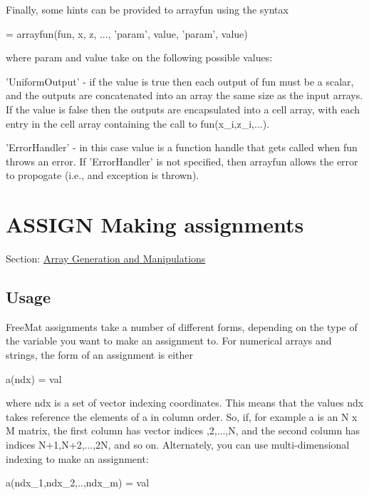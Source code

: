 Finally, some hints can be provided to {\ttfamily arrayfun} using the syntax \begin{DoxyVerb}   [y1,y2,...] = arrayfun(fun, x, z, ..., 'param', value, 'param', value)
\end{DoxyVerb}
 where {\ttfamily param} and {\ttfamily value} take on the following possible values\-: 
\begin{DoxyItemize}
\item {\ttfamily 'Uniform\-Output'} -\/ if the {\ttfamily value} is {\ttfamily true} then each output of {\ttfamily fun} must be a scalar, and the outputs are concatenated into an array the same size as the input arrays. If the {\ttfamily value} is {\ttfamily false} then the outputs are encapsulated into a cell array, with each entry in the cell array containing the call to {\ttfamily fun(x\-\_\-i,z\-\_\-i,...)}.  
\item {\ttfamily 'Error\-Handler'} -\/ in this case {\ttfamily value} is a function handle that gets called when {\ttfamily fun} throws an error. If {\ttfamily 'Error\-Handler'} is not specified, then {\ttfamily arrayfun} allows the error to propogate (i.\-e., and exception is thrown).  
\end{DoxyItemize}\hypertarget{array_assign}{}\section{A\-S\-S\-I\-G\-N Making assignments}\label{array_assign}
Section\-: \hyperlink{sec_array}{Array Generation and Manipulations} \hypertarget{vtkwidgets_vtkxyplotwidget_Usage}{}\subsection{Usage}\label{vtkwidgets_vtkxyplotwidget_Usage}
Free\-Mat assignments take a number of different forms, depending on the type of the variable you want to make an assignment to. For numerical arrays and strings, the form of an assignment is either \begin{DoxyVerb}  a(ndx) = val
\end{DoxyVerb}
 where {\ttfamily ndx} is a set of vector indexing coordinates. This means that the values {\ttfamily ndx} takes reference the elements of {\ttfamily a} in column order. So, if, for example {\ttfamily a} is an {\ttfamily N x M} matrix, the first column has vector indices {,2,...,N}, and the second column has indices {\ttfamily N+1,N+2,...,2\-N}, and so on. Alternately, you can use multi-\/dimensional indexing to make an assignment\-: \begin{DoxyVerb}  a(ndx_1,ndx_2,..,ndx_m) = val
\end{DoxyVerb}
